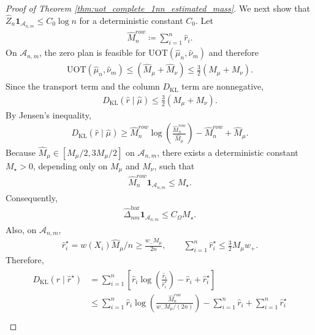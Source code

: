 \documentclass[10pt,a4paper]{amsart}
\newcommand{\KL}{\mathrm{KL}}
\renewcommand{\hat}{\widehat}
\begin{document}
\begin{proof}[Proof of Theorem \ref{thm:uot_complete_1nn_estimated_mass}]
We next show that $\hat Z_n\mathbf{1}_{\mathcal{A}_{n,m}}\le C_0\log n$ for a deterministic constant $C_0$.
Let
\begin{align}
    \hat M_n^{row}\coloneqq \sum_{i=1}^n \hat r_i.
\end{align}
On $\mathcal{A}_{n,m}$, the zero plan is feasible for $\mathrm{UOT}(\hat\mu_n,\hat\nu_m)$ and therefore
\begin{align}
    \mathrm{UOT}(\hat\mu_n,\hat\nu_m)
    \le
    (\hat M_\mu+\hat M_\nu)
    \le
    \frac{3}{2}(M_\mu+M_\nu).
\end{align}
Since the transport term and the {column $D_\KL$ term} are nonnegative,
\begin{align}
    {D_\KL}(\hat r\mid \hat\mu)
    \le
    \frac{3}{2}(M_\mu+M_\nu).
\end{align}
By Jensen's inequality,
\begin{align}
    {D_\KL}(\hat r\mid \hat\mu)
    \ge
    \hat M_n^{row}\log\left(\frac{\hat M_n^{row}}{\hat M_\mu}\right)
    - \hat M_n^{row}+\hat M_\mu.
\end{align}
Because $\hat M_\mu\in[M_\mu/2,3M_\mu/2]$ on $\mathcal{A}_{n,m}$, there exists a deterministic constant $M_\star>0$, depending only on $M_\mu$ and $M_\nu$, such that
\begin{align}
    \hat M_n^{row}\mathbf{1}_{\mathcal{A}_{n,m}}
    \le
    M_\star.
\end{align}
Consequently,
\begin{align}
\label{eq:uot_complete_1nn_estimated_mass_bar_uniform}
    \hat\Delta_{nm}^{\mathrm{bar}}\mathbf{1}_{\mathcal{A}_{n,m}}
    \le
    C_\Omega M_\star.
\end{align}
Also, on $\mathcal{A}_{n,m}$,
\begin{align}
    \hat r_i^\star
    =
    w(X_i){\hat M_\mu/n}
    \ge
    \frac{w_-M_\mu}{2n},
    \qquad
    \sum_{i=1}^n \hat r_i^\star
    \le
    \frac{3}{2}M_\mu w_+.
\end{align}
Therefore,
\begin{align}
\label{eq:uot_complete_1nn_estimated_mass_kl_uniform}
\begin{aligned}
    {D_\KL}(\hat r\mid \hat r^\star)
    &=
    \sum_{i=1}^n
    \left[
        \hat r_i\log\left(\frac{\hat r_i}{\hat r_i^\star}\right)-\hat r_i+\hat r_i^\star
    \right] \\
    &\le
    \sum_{i=1}^n \hat r_i \log\left(\frac{\hat M_n^{row}}{w_-M_\mu/(2n)}\right)
    - \sum_{i=1}^n \hat r_i + \sum_{i=1}^n \hat r_i^\star \\

\end{aligned}
\end{align}
\end{proof}
\end{document}

